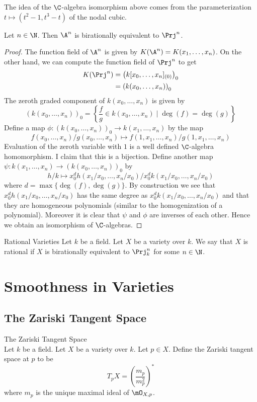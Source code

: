 \documentclass[a4paper]{article}
\begin{document}
The idea of the $\C$-algebra isomorphism above comes from the parameterization $t\mapsto(t^2-1,t^3-t)$ of the nodal cubic. 

\begin{lmm}{}{} Let $n\in\N$. Then $\A^n$ is birationally equivalent to $\Prj^n$. 
\begin{proof}
The function field of $\A^n$ is given by $K(\A^n)=K(x_1,\dots,x_n)$. On the other hand, we can compute the function field of $\Prj^n$ to get 
\begin{align*}
K(\Prj^n)&=\left(k[x_0,\dots,x_n]_{(0)}\right)_0\\
&=\left(k(x_0,\dots,x_n)\right)_0
\end{align*}
The zeroth graded component of $k(x_0,\dots,x_n)$ is given by $$(k(x_0,\dots,x_n))_0=\left\{\frac{f}{g}\in k(x_0,\dots,x_n)\;|\;\deg(f)=\deg(g)\right\}$$ Define a map $\phi:(k(x_0,\dots,x_n))_0\to k(x_1,\dots,x_n)$ by the map $$f(x_0,\dots,x_n)/g(x_0,\dots,x_n)\mapsto f(1,x_1,\dots,x_n)/g(1,x_1,\dots,x_n)$$ Evaluation of the zeroth variable with $1$ is a well defined $\C$-algebra homomorphism. I claim that this is a bijection. Define another map $\psi:k(x_1,\dots,x_n)\to(k(x_0,\dots,x_n))_0$ by $$h/k\mapsto x_0^d h(x_1/x_0,\dots,x_n/x_0)/x_0^d k(x_1/x_0,\dots,x_n/x_0)$$ where $d=\max\{\deg(f),\deg(g)\}$. By construction we see that $x_0^d h(x_1/x_0,\dots,x_n/x_0)$ has the same degree as $x_0^d k(x_1/x_0,\dots,x_n/x_0)$ and that they are homogeneous polynomials (similar to the homogenization of a polynomial). Moreover it is clear that $\psi$ and $\phi$ are inverses of each other. Hence we obtain an isomorphism of $\C$-algebras. 
\end{proof}
\end{lmm}

\begin{defn}{Rational Varieties}{} Let $k$ be a field. Let $X$ be a variety over $k$. We say that $X$ is rational if $X$ is birationally equivalent to $\Prj_k^n$ for some $n\in\N$. 
\end{defn}

\pagebreak
\section{Smoothness in Varieties}
\subsection{The Zariski Tangent Space}
\begin{defn}{The Zariski Tangent Space}{}\\
Let $k$ be a field. Let $X$ be a variety over $k$. Let $p\in X$. Define the Zariski tangent space at $p$ to be $$T_pX=\left(\frac{m_p}{m_p^2}\right)^\ast$$ where $m_p$ is the unique maximal ideal of $\mO_{X,p}$. 
\end{defn}
\end{document}
